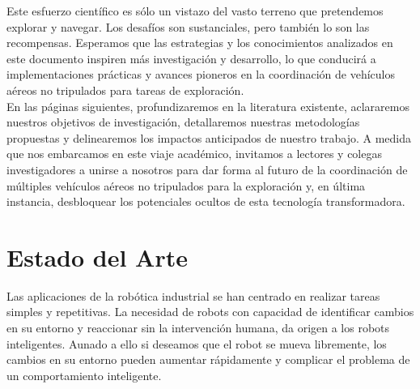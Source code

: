 \documentclass[sigconf]{acmart}
\begin{document}
Este esfuerzo científico es sólo un vistazo del vasto terreno que pretendemos explorar y navegar. Los desafíos son sustanciales, pero también lo son las recompensas. Esperamos que las estrategias y los conocimientos analizados en este documento inspiren más investigación y desarrollo, lo que conducirá a implementaciones prácticas y avances pioneros en la coordinación de vehículos aéreos no tripulados para tareas de exploración.\\

En las páginas siguientes, profundizaremos en la literatura existente, aclararemos nuestros objetivos de investigación, detallaremos nuestras metodologías propuestas y delinearemos los impactos anticipados de nuestro trabajo. A medida que nos embarcamos en este viaje académico, invitamos a lectores y colegas investigadores a unirse a nosotros para dar forma al futuro de la coordinación de múltiples vehículos aéreos no tripulados para la exploración y, en última instancia, desbloquear los potenciales ocultos de esta tecnología transformadora.





\section{Estado del Arte}

Las aplicaciones de la robótica industrial se han centrado en realizar tareas simples y repetitivas. La necesidad de robots con capacidad de identificar cambios en su entorno y reaccionar sin la intervención humana, da origen a los robots inteligentes. Aunado a ello si deseamos que el robot se mueva libremente, los cambios en su entorno pueden aumentar rápidamente y complicar el problema de un comportamiento inteligente.\\
\end{document}
